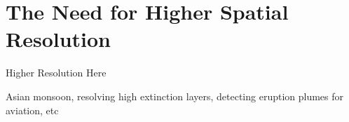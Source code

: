 \section{The Need for Higher Spatial Resolution}

Higher Resolution Here  

Asian monsoon, resolving high extinction layers, detecting eruption plumes for aviation, etc
